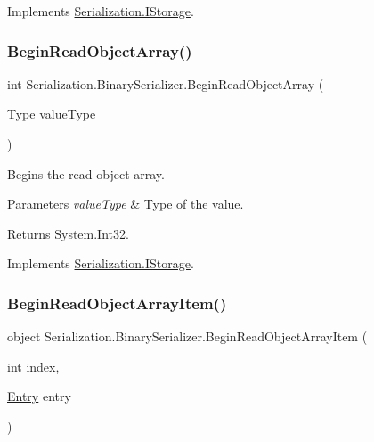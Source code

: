 Implements \hyperlink{interface_serialization_1_1_i_storage_a2178c0c68457e13a45fa7e80fa345037}{Serialization.\+I\+Storage}.

\mbox{\label{class_serialization_1_1_binary_serializer_a0d547b6b511f0e0e547f3e2b231d2b68}} 
\subsubsection{\texorpdfstring{Begin\+Read\+Object\+Array()}{BeginReadObjectArray()}}
{\footnotesize\ttfamily int Serialization.\+Binary\+Serializer.\+Begin\+Read\+Object\+Array (\begin{DoxyParamCaption}\item[{Type}]{value\+Type }\end{DoxyParamCaption})\hspace{0.3cm}{\ttfamily [inline]}}



Begins the read object array. 


\begin{DoxyParams}{Parameters}
{\em value\+Type} & Type of the value.\\
\hline
\end{DoxyParams}
\begin{DoxyReturn}{Returns}
System.\+Int32.
\end{DoxyReturn}


Implements \hyperlink{interface_serialization_1_1_i_storage_a4d7741da3862a1398e0566d362eb0827}{Serialization.\+I\+Storage}.

\mbox{\label{class_serialization_1_1_binary_serializer_ac4a4d8051a5c10d82e23fd004ad344fb}} 
\subsubsection{\texorpdfstring{Begin\+Read\+Object\+Array\+Item()}{BeginReadObjectArrayItem()}}
{\footnotesize\ttfamily object Serialization.\+Binary\+Serializer.\+Begin\+Read\+Object\+Array\+Item (\begin{DoxyParamCaption}\item[{int}]{index,  }\item[{\hyperlink{class_serialization_1_1_entry}{Entry}}]{entry }\end{DoxyParamCaption})\hspace{0.3cm}{\ttfamily [inline]}}




